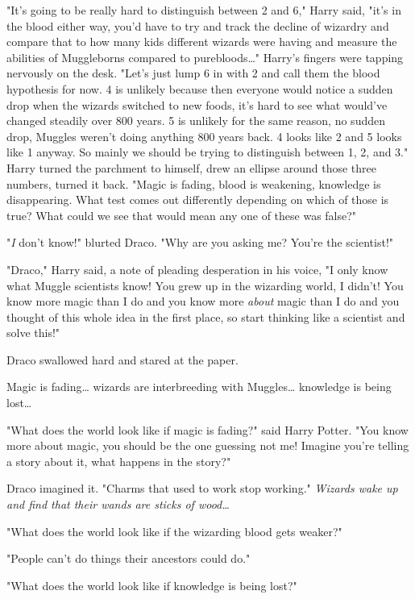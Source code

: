"It's going to be really hard to distinguish between 2 and 6," Harry said, 
"it's in the blood either way, you'd have to try and track the decline of 
wizardry and compare that to how many kids different wizards were having and 
measure the abilities of Muggleborns compared to purebloods{\ldots}" Harry's 
fingers were tapping nervously on the desk. "Let's just lump 6 in with 2 and 
call them the blood hypothesis for now. 4 is unlikely because then everyone 
would notice a sudden drop when the wizards switched to new foods, it's hard to 
see what would've changed steadily over 800 years. 5 is unlikely for the same 
reason, no sudden drop, Muggles weren't doing anything 800 years back. 4 looks 
like 2 and 5 looks like 1 anyway. So mainly we should be trying to distinguish 
between 1, 2, and 3." Harry turned the parchment to himself, drew an ellipse 
around those three numbers, turned it back. "Magic is fading, blood is 
weakening, knowledge is disappearing. What test comes out differently depending 
on which of those is true? What could we see that would mean any one of these 
was false?"

"\emph{I} don't know!" blurted Draco. "Why are you asking me? You're the 
scientist!"

"Draco," Harry said, a note of pleading desperation in his voice, "I only know 
what Muggle scientists know! You grew up in the wizarding world, I didn't! You 
know more magic than I do and you know more \emph{about} magic than I do and 
you thought of this whole idea in the first place, so start thinking like a 
scientist and solve this!"

Draco swallowed hard and stared at the paper.

Magic is fading{\ldots} wizards are interbreeding with Muggles{\ldots} 
knowledge is being lost{\ldots}

"What does the world look like if magic is fading?" said Harry Potter. "You 
know more about magic, you should be the one guessing not me! Imagine you're 
telling a story about it, what happens in the story?"

Draco imagined it. "Charms that used to work stop working." \emph{Wizards wake 
up and find that their wands are sticks of wood{\ldots}}

"What does the world look like if the wizarding blood gets weaker?"

"People can't do things their ancestors could do."

"What does the world look like if knowledge is being lost?"

